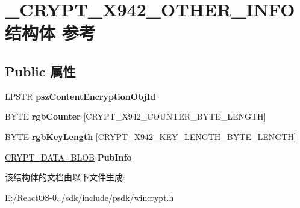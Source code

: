 \hypertarget{struct___c_r_y_p_t___x942___o_t_h_e_r___i_n_f_o}{}\section{\+\_\+\+C\+R\+Y\+P\+T\+\_\+\+X942\+\_\+\+O\+T\+H\+E\+R\+\_\+\+I\+N\+F\+O结构体 参考}
\label{struct___c_r_y_p_t___x942___o_t_h_e_r___i_n_f_o}
\subsection*{Public 属性}
\begin{DoxyCompactItemize}
\item 
\mbox{\label{struct___c_r_y_p_t___x942___o_t_h_e_r___i_n_f_o_aca1dee4c95f6481d8afeb088ab81f557}} 
L\+P\+S\+TR {\bfseries psz\+Content\+Encryption\+Obj\+Id}
\item 
\mbox{\label{struct___c_r_y_p_t___x942___o_t_h_e_r___i_n_f_o_a20efc998d5e6d581d098d7a96edcec72}} 
B\+Y\+TE {\bfseries rgb\+Counter} \mbox{[}C\+R\+Y\+P\+T\+\_\+\+X942\+\_\+\+C\+O\+U\+N\+T\+E\+R\+\_\+\+B\+Y\+T\+E\+\_\+\+L\+E\+N\+G\+TH\mbox{]}
\item 
\mbox{\label{struct___c_r_y_p_t___x942___o_t_h_e_r___i_n_f_o_a2d990a836302d895e805505df0a59047}} 
B\+Y\+TE {\bfseries rgb\+Key\+Length} \mbox{[}C\+R\+Y\+P\+T\+\_\+\+X942\+\_\+\+K\+E\+Y\+\_\+\+L\+E\+N\+G\+T\+H\+\_\+\+B\+Y\+T\+E\+\_\+\+L\+E\+N\+G\+TH\mbox{]}
\item 
\mbox{\label{struct___c_r_y_p_t___x942___o_t_h_e_r___i_n_f_o_ad376789b0df514452ca10d8ae64517ac}} 
\hyperlink{struct___c_r_y_p_t_o_a_p_i___b_l_o_b}{C\+R\+Y\+P\+T\+\_\+\+D\+A\+T\+A\+\_\+\+B\+L\+OB} {\bfseries Pub\+Info}
\end{DoxyCompactItemize}


该结构体的文档由以下文件生成\+:\begin{DoxyCompactItemize}
\item 
E\+:/\+React\+O\+S-\/0../sdk/include/psdk/wincrypt.\+h\end{DoxyCompactItemize}
